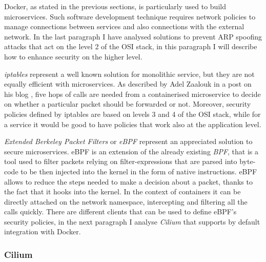 \documentclass[a4paper,12pt]{article}
\begin{document}
Docker, as stated in the previous sections, is particularly used to build
microservices. Such software development technique requires network policies to
manage connections between services and also connections with the external
network. In the last paragraph I have analysed solutions to prevent ARP spoofing
attacks that act on the level 2 of the OSI stack, in this paragraph I will
describe how to enhance security on the higher level. \par \textit{iptables}
represent a well known solution for monolithic service, but they are not equally
efficient with microservices. As described by Adel Zaalouk in a post on his blog
\cite{zaalouk_networking}, five hops of calls are needed from a containerised
microservice to decide on whether a particular packet should be forwarded or
not. Moreover, security policies defined by iptables are based on levels 3 and 4
of the OSI stack, while for a service it would be good to have policies that
work also at the application level. \par \textit{Extended Berkeley Packet
Filters} or \textit{eBPF} represent an appreciated solution to secure
microservices. eBPF is an extension of the already existing \textit{BPF}, that
is a tool used to filter packets relying on filter-expressions that are parsed
into byte-code to be then injected into the kernel in the form of native
instructions. eBPF allows to reduce the steps needed to make a decision about a
packet, thanks to the fact that it hooks into the kernel. In the context of
containers it can be directly attached on the network namespace, intercepting
and filtering all the calls quickly. There are different clients that can be
used to define eBPF's security policies, in the next paragraph I analyse
\textit{Cilium} that supports by default integration with Docker.

\subsubsection{Cilium}
\end{document}
